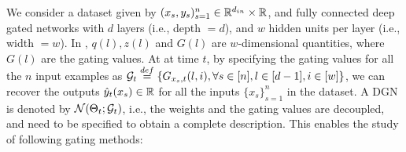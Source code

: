 \begin{table}[!htb]
\begin{minipage}{0.5\columnwidth}
\end{minipage}
\begin{minipage}{0.5\columnwidth}
\end{minipage}
\caption{Here $\Theta(l,i,j)$ denotes the weight connecting node $i$ of layer $l-1$ to node $j$ of layer $l$, and $\odot$ stands for the \emph{Hadamard} product. The left table shows a DGN, and the right table shows a gating network. }
\label{tb:dgn}
\end{table}
We consider a dataset given by $(x_s,y_s)_{s=1}^n\in \mathbb{R}^{d_{in}}\times \mathbb{R}$, and fully connected deep gated networks with $d$ layers (i.e., depth $=d$), and $w$ hidden units per layer (i.e., width $=w$). In , $q(l),z(l)$ and $G(l)$ are $w$-dimensional quantities, where $G(l)$ are the gating values.  At at time $t$, by specifying the gating values for all the $n$ input examples as $\mathcal{G}_t\stackrel{def}=\{G_{x_{s},t}(l,i), \forall s\in[n],l\in[d-1],i\in[w]\}$, we can recover the outputs $\hat{y}_t(x_s)\in \mathbb{R}$ for all the inputs $\{x_s\}_{s=1}^n$ in the dataset.  A DGN is denoted by $\mathcal{N}(\Theta_t;\mathcal{G}_t)$, i.e., the weights and the gating values are decoupled, and need to be specified to obtain a complete description. This enables the study of following gating methods:\\
